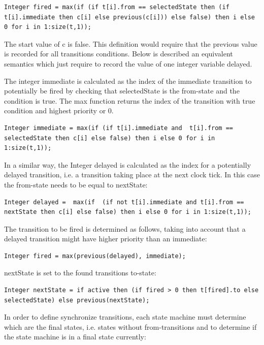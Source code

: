 \documentclass[10pt,a4paper]{report}
\begin{document}
\begin{lstlisting}[language=modelica]
  Integer fired = max(if (if t[i].from == selectedState then (if t[i].immediate then c[i] else previous(c[i])) else false) then i else 0 for i in 1:size(t,1));
\end{lstlisting}
The start value of c is false. This definition would require that the
previous value is recorded for all transitions conditions. Below is
described an equivalent semantics which just require to record the value
of one integer variable delayed.

The integer immediate is calculated as the index of the immediate
transition to potentially be fired by checking that selectedState is the
from-state and the condition is true. The max function returns the index
of the transition with true condition and highest priority or 0.

\begin{lstlisting}[language=modelica]
  Integer immediate = max(if (if t[i].immediate and  t[i].from == selectedState then c[i] else false) then i else 0 for i in 1:size(t,1));
\end{lstlisting}
In a similar way, the Integer delayed is calculated as the index for a
potentially delayed transition, i.e. a transition taking place at the
next clock tick. In this case the from-state needs to be equal to
nextState:

\begin{lstlisting}[language=modelica]
  Integer delayed =  max(if  (if not t[i].immediate and t[i].from == nextState then c[i] else false) then i else 0 for i in 1:size(t,1));
\end{lstlisting}
The transition to be fired is determined as follows, taking into account
that a delayed transition might have higher priority than an immediate:

\begin{lstlisting}[language=modelica]
  Integer fired = max(previous(delayed), immediate);
\end{lstlisting}
nextState is set to the found transitions to-state:

\begin{lstlisting}[language=modelica]
  Integer nextState = if active then (if fired > 0 then t[fired].to else selectedState) else previous(nextState);
\end{lstlisting}
In order to define synchronize transitions, each state machine must
determine which are the final states, i.e. states without
from-transitions and to determine if the state machine is in a final
state currently:
\end{document}
